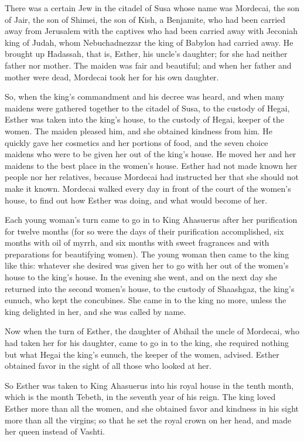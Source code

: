 \myverse{}There was a certain Jew in the citadel of Susa whose name was Mordecai,
the son of Jair, the son of Shimei, the son of Kish, a Benjamite,
\myverse{}who had been carried away from Jerusalem with the captives who had been carried
away with Jeconiah king of Judah, whom Nebuchadnezzar the king of Babylon had carried away.
\myverse{}He brought up Hadassah, that is, Esther, his uncle’s daughter; for she had neither
father nor mother. The maiden was fair and beautiful; and when her father and mother were dead, Mordecai
took her for his own daughter.

\myverse{}So, when the king’s commandment and his decree was heard, and when
many maidens were gathered together to the citadel of Susa, to the custody of Hegai, Esther was taken
into the king’s house, to the custody of Hegai, keeper of the women.
\myverse{}The maiden pleased him, and she obtained kindness from him. He quickly gave
her cosmetics and her portions of food, and the seven choice maidens who were to be given her out of the
king’s house. He moved her and her maidens to the best place in the women’s house.
\myverse{}Esther had not made known her people nor her relatives, because Mordecai had
instructed her that she should not make it known.
\myverse{}Mordecai walked every day in front of the court of the women’s house, to find
out how Esther was doing, and what would become of her.

\myverse{}Each young woman’s turn came to go in to King Ahasuerus after
her purification for twelve months (for so were the days of their purification accomplished, six months
with oil of myrrh, and six months with sweet fragrances and with preparations for beautifying women).
\myverse{}The young woman then came to the king like this: whatever she desired was
given her to go with her out of the women’s house to the king’s house.
\myverse{}In the evening she went, and on the next day she returned into the second
women’s house, to the custody of Shaashgaz, the king’s eunuch, who kept the concubines. She came in to
the king no more, unless the king delighted in her, and she was called by name.

\myverse{}Now when the turn of Esther, the daughter of Abihail the uncle
of Mordecai, who had taken her for his daughter, came to go in to the king, she required nothing but what
Hegai the king’s eunuch, the keeper of the women, advised. Esther obtained favor in the sight of all those
who looked at her.

\myverse{}So Esther was taken to King Ahasuerus into his royal house in
the tenth month, which is the month Tebeth, in the seventh year of his reign.
\myverse{}The king loved Esther more than all the women, and she obtained favor and
kindness in his sight more than all the virgins; so that he set the royal crown on her head, and made
her queen instead of Vashti.

